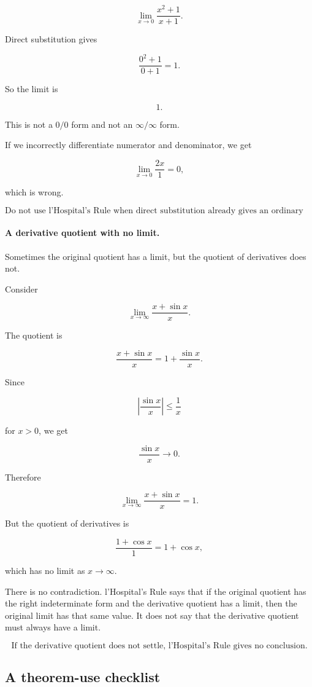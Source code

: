 \[
\lim_{x\to0}\frac{x^2+1}{x+1}.
\]

Direct substitution gives

\[
\frac{0^2+1}{0+1}=1.
\]

So the limit is

\[
1.
\]

This is not a \(0/0\) form and not an \(\infty/\infty\) form.

If we incorrectly differentiate numerator and denominator, we get

\[
\lim_{x\to0}\frac{2x}{1}=0,
\]

which is wrong.

\[
\boxed{
\text{Do not use l'Hospital's Rule when direct substitution already gives an ordinary number.}
}
\]

\paragraph{A derivative quotient with no limit.}
Sometimes the original quotient has a limit, but the quotient of derivatives does not.

Consider

\[
\lim_{x\to\infty}\frac{x+\sin x}{x}.
\]

The quotient is

\[
\frac{x+\sin x}{x}
=
1+\frac{\sin x}{x}.
\]

Since

\[
\left|\frac{\sin x}{x}\right|\le \frac1x
\]

for \(x>0\), we get

\[
\frac{\sin x}{x}\to0.
\]

Therefore

\[
\lim_{x\to\infty}\frac{x+\sin x}{x}=1.
\]

But the quotient of derivatives is

\[
\frac{1+\cos x}{1}=1+\cos x,
\]

which has no limit as \(x\to\infty\).

There is no contradiction.  l'Hospital's Rule says that if the original quotient has the
right indeterminate form and the derivative quotient has a limit, then the original limit
has that same value.  It does not say that the derivative quotient must always have a
limit.

\[
\boxed{
\text{If the derivative quotient does not settle, l'Hospital's Rule gives no conclusion.}
}
\]

\subsection{A theorem-use checklist}
\label{subsec:chapter-6-theorem-checklist}

